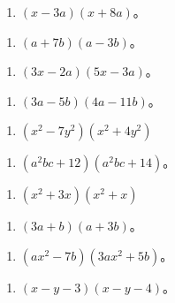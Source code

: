 \begin{enumerate}[start=14]
\item
  \((x - 3a)(x + 8a)\)。
\end{enumerate}

\begin{enumerate}[start=16]
\item
  \((a + 7b)(a - 3b)\)。
\end{enumerate}

\begin{enumerate}[start=18]
\item
  \((3x - 2a)(5x - 3a)\)。
\end{enumerate}

\begin{enumerate}[start=20]
\item
  \((3a - 5b)(4a - 11b)\)。
\end{enumerate}

\begin{enumerate}[start=22]
\item
  \((x^{2} - 7y^{2})(x^{2} + 4y^{2})\)
\end{enumerate}

\begin{enumerate}[start=24]
\item
  \((a^2 bc + 12)(a^2 bc + 14)\)。
\end{enumerate}

\begin{enumerate}[start=26]
\item
  \((x^{2} + 3x)(x^{2} + x)\)
\end{enumerate}

\begin{enumerate}[start=28]
\item
  \((3a + b)(a + 3b)\)。
\end{enumerate}

\begin{enumerate}[start=30]
\item
  \((ax^{2} - 7b)(3ax^{2} + 5b)\)。
\end{enumerate}

\begin{enumerate}[start=32]
\item
  \((x - y - 3)(x - y - 4)\)。
\end{enumerate}


